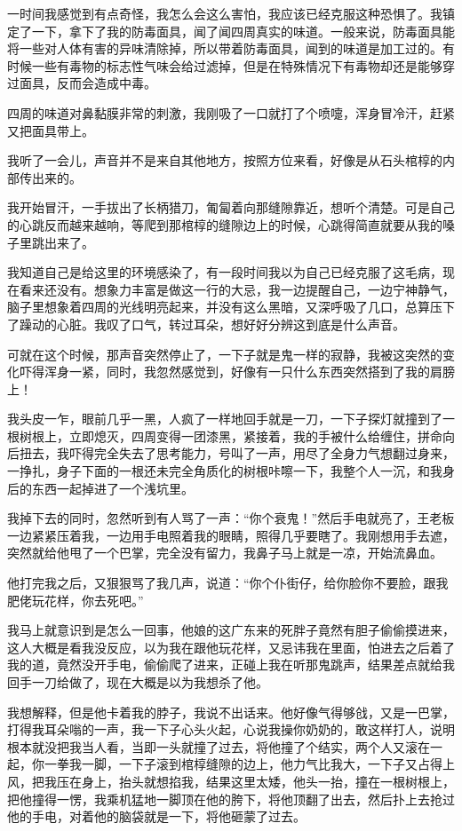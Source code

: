 一时间我感觉到有点奇怪，我怎么会这么害怕，我应该已经克服这种恐惧了。我镇定了一下，拿下了我的防毒面具，闻了闻四周真实的味道。一般来说，防毒面具能将一些对人体有害的异味清除掉，所以带着防毒面具，闻到的味道是加工过的。有时候一些有毒物的标志性气味会给过滤掉，但是在特殊情况下有毒物却还是能够穿过面具，反而会造成中毒。

四周的味道对鼻黏膜非常的刺激，我刚吸了一口就打了个喷嚏，浑身冒冷汗，赶紧又把面具带上。

我听了一会儿，声音并不是来自其他地方，按照方位来看，好像是从石头棺椁的内部传出来的。

我开始冒汗，一手拔出了长柄猎刀，匍匐着向那缝隙靠近，想听个清楚。可是自己的心跳反而越来越响，等爬到那棺椁的缝隙边上的时候，心跳得简直就要从我的嗓子里跳出来了。

我知道自己是给这里的环境感染了，有一段时间我以为自己已经克服了这毛病，现在看来还没有。想象力丰富是做这一行的大忌，我一边提醒自己，一边宁神静气，脑子里想象着四周的光线明亮起来，并没有这么黑暗，又深呼吸了几口，总算压下了躁动的心脏。我叹了口气，转过耳朵，想好好分辨这到底是什么声音。

可就在这个时候，那声音突然停止了，一下子就是鬼一样的寂静，我被这突然的变化吓得浑身一紧，同时，我忽然感觉到，好像有一只什么东西突然搭到了我的肩膀上！

我头皮一乍，眼前几乎一黑，人疯了一样地回手就是一刀，一下子探灯就撞到了一根树根上，立即熄灭，四周变得一团漆黑，紧接着，我的手被什么给缠住，拼命向后扭去，我吓得完全失去了思考能力，号叫了一声，用尽了全身力气想翻过身来，一挣扎，身子下面的一根还未完全角质化的树根咔嚓一下，我整个人一沉，和我身后的东西一起掉进了一个浅坑里。

我掉下去的同时，忽然听到有人骂了一声：“你个衰鬼！”然后手电就亮了，王老板一边紧紧压着我，一边用手电照着我的眼睛，照得几乎要瞎了。我刚想用手去遮，突然就给他甩了一个巴掌，完全没有留力，我鼻子马上就是一凉，开始流鼻血。

他打完我之后，又狠狠骂了我几声，说道：“你个仆街仔，给你脸你不要脸，跟我肥佬玩花样，你去死吧。”

我马上就意识到是怎么一回事，他娘的这广东来的死胖子竟然有胆子偷偷摸进来，这人大概是看我没反应，以为我在跟他玩花样，又忌讳我在里面，怕进去之后着了我的道，竟然没开手电，偷偷爬了进来，正碰上我在听那鬼跳声，结果差点就给我回手一刀给做了，现在大概是以为我想杀了他。

我想解释，但是他卡着我的脖子，我说不出话来。他好像气得够戗，又是一巴掌，打得我耳朵嗡的一声，我一下子心头火起，心说我操你奶奶的，敢这样打人，说明根本就没把我当人看，当即一头就撞了过去，将他撞了个结实，两个人又滚在一起，你一拳我一脚，一下子滚到棺椁缝隙的边上，他力气比我大，一下子又占得上风，把我压在身上，抬头就想掐我，结果这里太矮，他头一抬，撞在一根树根上，把他撞得一愣，我乘机猛地一脚顶在他的胯下，将他顶翻了出去，然后扑上去抢过他的手电，对着他的脑袋就是一下，将他砸蒙了过去。

